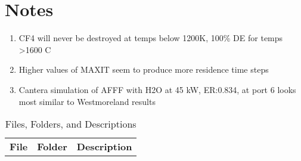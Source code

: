 \documentclass{article}
\begin{document}
\section*{Notes}
\begin{enumerate}
    \item CF4 will never be destroyed at temps below 1200K, 100\% DE for temps >1600 C
    \item Higher values of MAXIT seem to produce more residence time steps
    \item Cantera simulation of AFFF with H2O at 45 kW, ER:0.834, at port 6 looks most similar to Westmoreland results
\end{enumerate}
\pagebreak
\begin{table}[H] %
\centering
\renewcommand{\arraystretch}{1.256}
\caption{Files, Folders, and Descriptions}
\begin{tabular}{>{\centering\arraybackslash}m{}>{\scriptsize\centering\arraybackslash}m{}>{\footnotesize\centering\arraybackslash}m{}}\toprule

\normalsize{\textbf{File}}      & \normalsize{\textbf{Folder}}      & \normalsize{\textbf{Description}} \\\cmidrule(r){1-1}\cmidrule(lr){2-2}\cmidrule(l){3-3}


\end{tabular}
\end{table}
\end{document}
